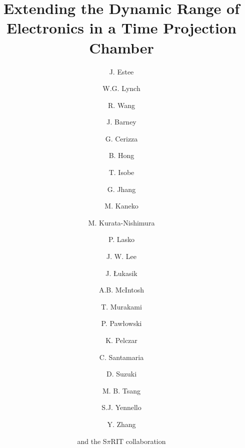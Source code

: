 \documentclass[review]{elsarticle}
\begin{document}
\begin{frontmatter}

\title{Extending the Dynamic Range of Electronics in a Time Projection Chamber}


\author[msu,nscl]{J. Estee}
\author[msu,nscl]{W.G. Lynch}
\author[china1,china2]{R. Wang}
\author[msu,nscl]{J. Barney}
\author[msu,nscl]{G. Cerizza}
\author[kor]{B. Hong}
\author[riken]{T. Isobe}
\author[nscl]{G. Jhang}
\author[kyoto]{M. Kaneko}
\author[riken]{M. Kurata-Nishimura}
\author[krakow]{P. Lasko}
\author[kor]{J. W. Lee}
\author[krakow]{J. \L ukasik}
\author[a&m]{A.B. McIntosh}
\author[kyoto]{T. Murakami}
\author[krakow]{P. Paw\l owski}
\author[poland]{K. Pelczar}
\author[nscl]{C. Santamaria}
\author[riken]{D. Suzuki}
\author[nscl]{M. B. Tsang}
\author[a&m]{S.J. Yennello}
\author[tsing]{Y. Zhang}
\author[]{and the S$\pi$RIT collaboration}

\address[msu]{Dept. Physics and Astronomy, Michigan State University, East Lansing, Michigan, 48824, USA }
\address[nscl]{National Superconducting Cyclotron Laboratory, East Lansing, Michigan, 48824, USA}
\address[kor]{Department of Physics, Korea University, Seoul 136-703, Republic of Korea }
\address[riken]{RIKEN Nishina Center, Hirosawa 2-1, Wako, Saitama 351‐0198, Japan }
\address[kyoto]{Department of Physics, Kyoto University, Kita-shirakawa, Kyoto 606-8502, Japan }
\address[krakow]{Institute of Nuclear Physics PAN, ul. Radzikowskiego 15231-342 Krak\'{o}w, Poland}
\address[a&m]{Dept. of Physics and Astronomy, Texas A$\&$M University, College Station, TX 77843, USA }
\address[tsing]{Department of Physics, Tsinghua University, Beijing 100084, P. R. China}
\address[poland]{Faculty of Physics, Astronomy and Applied Computer Science, Jagiellonian University, ul. Go\l \k{e}bia 24, 31-007 Krak\'{o}w}
\address[china1]{State Key Laboratory of Radiation Medicine and Protection, School of Radiation Medicine and Protection, Soochow University, Suzhou 215123, China}
\address[china2]{Collaborative Innovation Center of Radiological Medicine of Jiangsu Higher Education Institutions, Suzhou 215123, China}



\begin{abstract}


\end{abstract}
\end{frontmatter}
\end{document}
